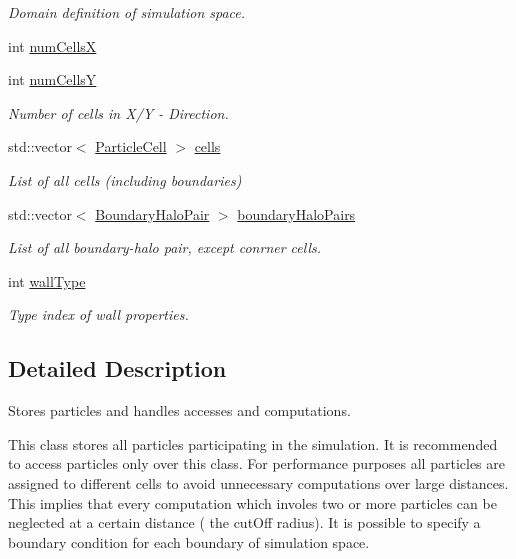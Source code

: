 \begin{DoxyCompactItemize}
\begin{DoxyCompactList}\small\item\em Domain definition of simulation space. \end{DoxyCompactList}\item 
int \hyperlink{classSimulation_1_1ParticleContainer_a26ff75d3f5c109fc354bb95e460bef20}{num\-Cells\-X}
\item 
int \hyperlink{classSimulation_1_1ParticleContainer_ae248a9742a4d62f0cc692214eef9ba63}{num\-Cells\-Y}
\begin{DoxyCompactList}\small\item\em Number of cells in X/\-Y -\/ Direction. \end{DoxyCompactList}\item 
std\-::vector$<$ \hyperlink{classSimulation_1_1ParticleCell}{Particle\-Cell} $>$ \hyperlink{classSimulation_1_1ParticleContainer_a3836f9563a3827414df5288a2f3fcee6}{cells}
\begin{DoxyCompactList}\small\item\em List of all cells (including boundaries) \end{DoxyCompactList}\item 
std\-::vector$<$ \hyperlink{structSimulation_1_1ParticleContainer_1_1BoundaryHaloPair}{Boundary\-Halo\-Pair} $>$ \hyperlink{classSimulation_1_1ParticleContainer_a7d56f7233d097b228ddea76670a9861f}{boundary\-Halo\-Pairs}
\begin{DoxyCompactList}\small\item\em List of all boundary-\/halo pair, except conrner cells. \end{DoxyCompactList}\item 
int \hyperlink{classSimulation_1_1ParticleContainer_a257c23a232693610d47c0ee082085a49}{wall\-Type}
\begin{DoxyCompactList}\small\item\em Type index of wall properties. \end{DoxyCompactList}\end{DoxyCompactItemize}


\subsection{Detailed Description}
Stores particles and handles accesses and computations. 

This class stores all particles participating in the simulation. It is recommended to access particles only over this class. For performance purposes all particles are assigned to different cells to avoid unnecessary computations over large distances. This implies that every computation which involes two or more particles can be neglected at a certain distance ( the cut\-Off radius). It is possible to specify a boundary condition for each boundary of simulation space. 

